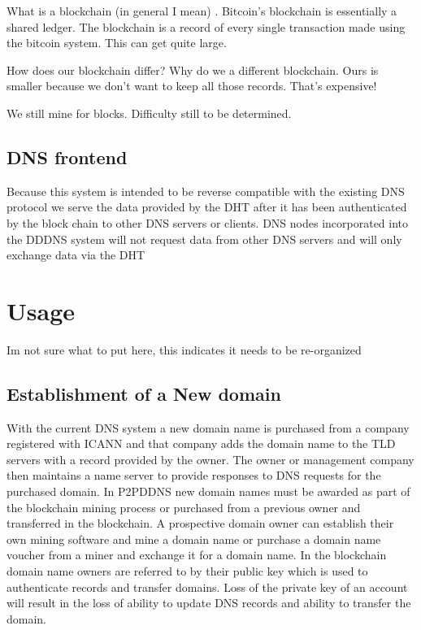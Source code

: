 \documentclass[11pt]{ieeetran} %
\begin{document}
What is a blockchain (in general I mean) \cite{bitcoin} \cite{namecoin}.
Bitcoin's blockchain is essentially a shared ledger.  The blockchain is a record of every single transaction made using the bitcoin system.  This can get quite large.

How does our blockchain differ?  Why do we a different blockchain.  Ours is smaller because we don't want to keep all those records. That's expensive! 

We still mine for blocks.  Difficulty still to be determined.


\subsection{DNS frontend}
Because this system is intended to be reverse compatible with the existing DNS protocol we serve the data provided by the DHT after it has been authenticated by the block chain to other DNS servers or clients. DNS nodes incorporated into the DDDNS system will not request data from other DNS servers and will only exchange data via the DHT 

\section{Usage}
Im not sure what to put here, this indicates it needs to be re-organized
\subsection{Establishment of a New domain}
With the current DNS system a new domain name is purchased from a company registered with ICANN and that company adds the domain name to the TLD servers with a record provided by the owner. The owner or management company then maintains a name server to provide responses to DNS requests for the purchased domain. In P2PDDNS new domain names must be awarded as part of the blockchain mining process or purchased from a previous owner and transferred in the blockchain. A prospective domain owner can establish their own mining software and mine a domain name or purchase a domain name voucher from a miner and exchange it for a domain name. In the blockchain domain name owners are referred to by their public key which is used to authenticate records and transfer domains. Loss of the private key of an account will result in the loss of ability to update DNS records and ability to transfer the domain. 
\end{document}
